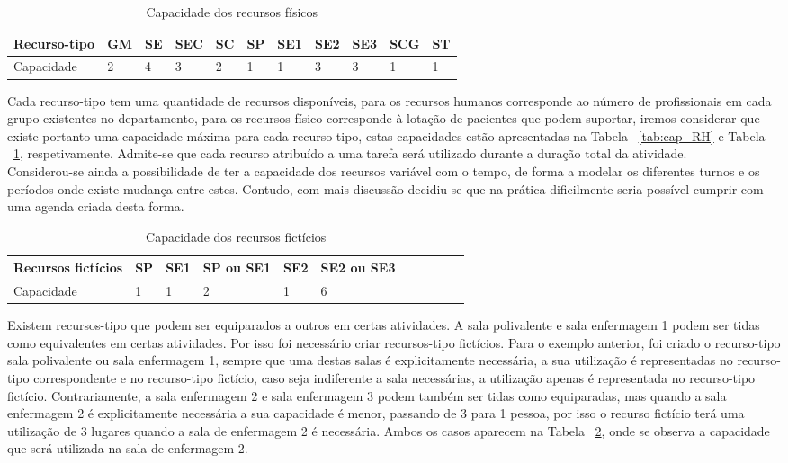 \begin{table}[H]
\caption{Capacidade dos recursos físicos}
\label{tab:cap_RFis}
\begin{tabular}{lllllllllll}
\hline
Recurso-tipo & GM & SE & SEC & SC & SP & SE1 & SE2 & SE3 & SCG & ST\\ \hline
Capacidade   & 2  & 4  & 3   & 2  & 1  & 1   & 3   & 3   & 1   & 1
\end{tabular}
\end{table}

Cada recurso-tipo tem uma quantidade de recursos disponíveis, para os recursos humanos corresponde ao número de profissionais em cada grupo existentes no departamento, para os recursos físico corresponde à lotação de pacientes que podem suportar, iremos considerar que existe portanto uma capacidade máxima para cada recurso-tipo, estas capacidades estão apresentadas na Tabela ~\ref{tab:cap_RH} e Tabela ~\ref{tab:cap_RFis}, respetivamente. Admite-se que cada recurso atribuído a uma tarefa será utilizado durante a duração total da atividade.\\
Considerou-se ainda a possibilidade de ter a capacidade dos recursos variável com o tempo, de forma a modelar os diferentes turnos e os períodos onde existe mudança entre estes. Contudo, com mais discussão decidiu-se que na prática dificilmente seria possível cumprir com uma agenda criada desta forma.\\

\begin{table}[H]
\caption{Capacidade dos recursos fictícios}
\label{tab:cap_RFic}
\begin{tabular}{lllllllllll}
\hline
Recursos fictícios & SP & SE1 & SP ou SE1 & SE2 & SE2 ou SE3\\ \hline
Capacidade         & 1  & 1   & 2         & 1   & 6
\end{tabular}
\end{table}

Existem recursos-tipo que podem ser equiparados a outros em certas atividades. A sala polivalente e sala enfermagem 1 podem ser tidas como equivalentes em certas atividades. Por isso foi necessário criar recursos-tipo fictícios. Para o exemplo anterior, foi criado o recurso-tipo sala polivalente ou sala enfermagem 1, sempre que uma destas salas é explicitamente necessária, a sua utilização é representadas no recurso-tipo correspondente e no recurso-tipo fictício, caso seja indiferente a sala necessárias, a utilização apenas é representada no recurso-tipo fictício. Contrariamente, a sala enfermagem 2 e sala enfermagem 3 podem também ser tidas como equiparadas, mas quando a sala enfermagem 2 é explicitamente necessária a sua capacidade é menor, passando de 3 para 1 pessoa, por isso o recurso fictício terá uma utilização de 3 lugares quando a sala de enfermagem 2 é necessária. Ambos os casos aparecem na Tabela ~\ref{tab:cap_RFic}, onde se observa a capacidade que será utilizada na sala de enfermagem 2.\\

